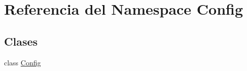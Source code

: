 \hypertarget{namespace_config}{\section{Referencia del Namespace Config}
\label{namespace_config}
}
\subsection*{Clases}
\begin{DoxyCompactItemize}
\item 
class \hyperlink{class_config_1_1_config}{Config}
\end{DoxyCompactItemize}
